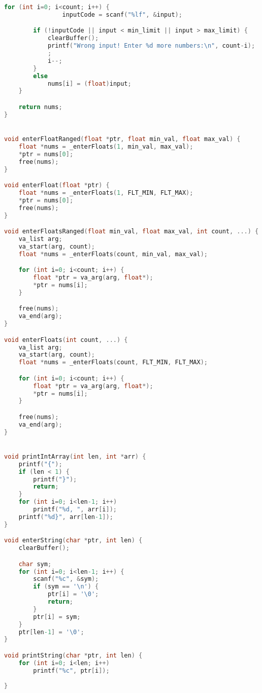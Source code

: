 \documentclass{article}
\begin{document}
\begin{lstlisting}[language=C]
    for (int i=0; i<count; i++) {
                inputCode = scanf("%lf", &input);

        if (!inputCode || input < min_limit || input > max_limit) {
            clearBuffer();
            printf("Wrong input! Enter %d more numbers:\n", count-i);
            ;
            i--;
        }
        else
            nums[i] = (float)input;
    }

    return nums;
}


void enterFloatRanged(float *ptr, float min_val, float max_val) {
    float *nums = _enterFloats(1, min_val, max_val);
    *ptr = nums[0];
    free(nums);
}

void enterFloat(float *ptr) {
    float *nums = _enterFloats(1, FLT_MIN, FLT_MAX);
    *ptr = nums[0];
    free(nums);
}

void enterFloatsRanged(float min_val, float max_val, int count, ...) {
    va_list arg;
    va_start(arg, count);
    float *nums = _enterFloats(count, min_val, max_val);

    for (int i=0; i<count; i++) {
        float *ptr = va_arg(arg, float*);
        *ptr = nums[i];
    }

    free(nums);
    va_end(arg);
}

void enterFloats(int count, ...) {
    va_list arg;
    va_start(arg, count);
    float *nums = _enterFloats(count, FLT_MIN, FLT_MAX);

    for (int i=0; i<count; i++) {
        float *ptr = va_arg(arg, float*);
        *ptr = nums[i];
    }

    free(nums);
    va_end(arg);
}


void printIntArray(int len, int *arr) {
    printf("{");
    if (len < 1) {
        printf("}");
        return;
    }
    for (int i=0; i<len-1; i++)
        printf("%d, ", arr[i]);
    printf("%d}", arr[len-1]);
}

void enterString(char *ptr, int len) {
    clearBuffer();

    char sym;
    for (int i=0; i<len-1; i++) {
        scanf("%c", &sym);
        if (sym == '\n') {
            ptr[i] = '\0';
            return;
        }
        ptr[i] = sym;
    }
    ptr[len-1] = '\0';
}

void printString(char *ptr, int len) {
    for (int i=0; i<len; i++) 
        printf("%c", ptr[i]);
    
}
\end{lstlisting}
\end{document}
